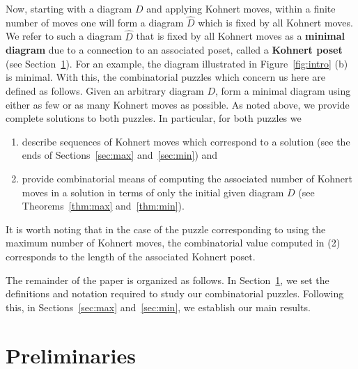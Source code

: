\documentclass[letterpaper,10pt]{article}
\begin{document}
\noindent
Now, starting with a diagram $D$ and applying Kohnert moves, within a finite number of moves one will form a diagram $\widehat{D}$ which is fixed by all Kohnert moves. We refer to such a diagram $\widehat{D}$ that is fixed by all Kohnert moves as a \textbf{minimal diagram} due to a connection to an associated poset, called a \textbf{Kohnert poset} (see Section~\ref{sec:prelim}). For an example, the diagram illustrated in Figure~\ref{fig:intro} (b) is minimal. With this, the combinatorial puzzles which concern us here are defined as follows. Given an arbitrary diagram $D$, form a minimal diagram using either as few or as many Kohnert moves as possible. As noted above, we provide complete solutions to both puzzles. In particular, for both puzzles we
\begin{enumerate}
    \item[(1)] describe sequences of Kohnert moves which correspond to a solution (see the ends of Sections~\ref{sec:max} and~\ref{sec:min}) and
    \item[(2)] provide combinatorial means of computing the associated number of Kohnert moves in a solution in terms of only the initial given diagram $D$ (see Theorems~\ref{thm:max} and~\ref{thm:min}).
\end{enumerate}
It is worth noting that in the case of the puzzle corresponding to using the maximum number of Kohnert moves, the combinatorial value computed in (2) corresponds to the length of the associated Kohnert poset.

The remainder of the paper is organized as follows. In Section~\ref{sec:prelim}, we set the definitions and notation required to study our combinatorial puzzles. Following this, in Sections~\ref{sec:max} and~\ref{sec:min}, we establish our main results. 



\section{Preliminaries}\label{sec:prelim}
\end{document}
